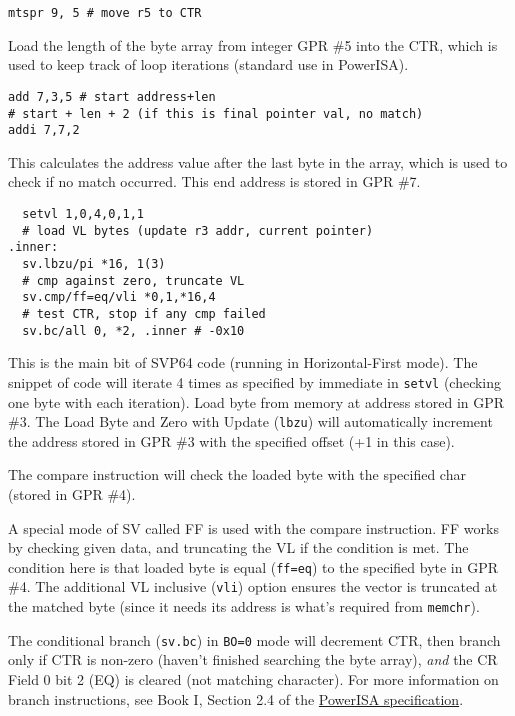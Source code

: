 \begin{verbatim}
mtspr 9, 5 # move r5 to CTR
\end{verbatim}
Load the length of the byte array from integer \acrfull{GPR} \#5 into
the \acrfull{CTR}, which is used to keep track of loop iterations
(standard use in PowerISA).

\begin{verbatim}
add 7,3,5 # start address+len
# start + len + 2 (if this is final pointer val, no match)
addi 7,7,2
\end{verbatim}
This calculates the address value after the last byte in the array, which is
used to check if no match occurred. This end address is stored in \acrshort{GPR} \#7.

\begin{verbatim}
  setvl 1,0,4,0,1,1
  # load VL bytes (update r3 addr, current pointer)
.inner:
  sv.lbzu/pi *16, 1(3)
  # cmp against zero, truncate VL
  sv.cmp/ff=eq/vli *0,1,*16,4
  # test CTR, stop if any cmp failed
  sv.bc/all 0, *2, .inner # -0x10
\end{verbatim}
This is the main bit of \acrshort{SVP64} code (running in Horizontal-First mode).
The snippet of code will iterate 4 times as specified by immediate
in \texttt{setvl} (checking one byte with each iteration).
Load byte from memory at address stored in \acrshort{GPR} \#3.
The Load Byte and Zero with Update (\texttt{lbzu}) will automatically increment
the address stored in \acrshort{GPR} \#3 with the specified offset (+1 in this case).

The compare instruction will check the loaded byte with the specified char
(stored in \acrshort{GPR} \#4).

A special mode of \acrfull{SV} called \acrfull{FF} is used with
the compare instruction. \acrshort{FF} works by checking given data, and truncating the
\acrfull{VL} if the condition is met. The condition here is that
loaded byte is equal (\texttt{ff=eq}) to the specified byte in \acrshort{GPR} \#4.
The additional \acrshort{VL} inclusive (\texttt{vli}) option ensures the vector is
truncated at the matched byte (since it needs its address is what's required
from \texttt{memchr}).

The conditional branch (\texttt{sv.bc}) in \texttt{BO=0} mode will decrement
\acrshort{CTR}, then branch only if \acrshort{CTR} is non-zero (haven't finished searching the
byte array), \textit{and} the \acrfull{CR} Field 0 bit 2 (EQ) is cleared
(not matching character). For more information on branch instructions,
see Book I, Section 2.4 of the
\href{https://openpower.foundation/specifications/isa/}{PowerISA specification}.

